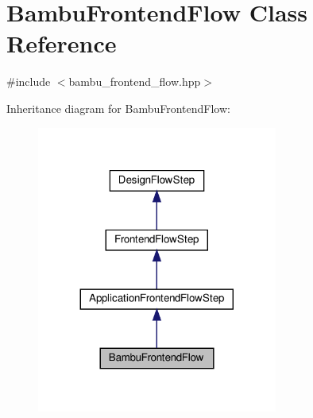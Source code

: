 \hypertarget{classBambuFrontendFlow}{}\section{Bambu\+Frontend\+Flow Class Reference}
\label{classBambuFrontendFlow}


{\ttfamily \#include $<$bambu\+\_\+frontend\+\_\+flow.\+hpp$>$}



Inheritance diagram for Bambu\+Frontend\+Flow\+:
\nopagebreak
\begin{figure}[H]
\begin{center}
\leavevmode
\includegraphics[width=224pt]{dc/d71/classBambuFrontendFlow__inherit__graph}
\end{center}
\end{figure}


